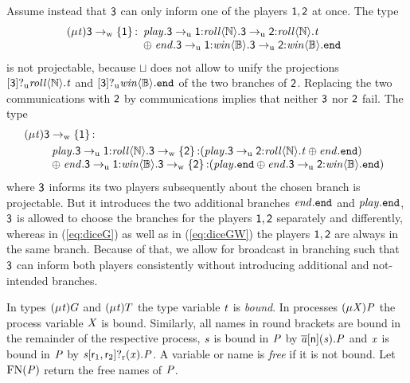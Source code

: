 Assume instead that $ \Role[3] $ can only inform one of the players $ \Role[1], \Role[2] $ at once.
The type
\begin{align*}
	\GRep{\TypeV}{\GBranW{\Role[3]}{\Set{ \Role[1] }}{}
		\begin{array}[t]{l}
			\Label[play].\GComU{\Role[3]}{\Role[1]}{\Label[roll]}{\nat}{\GComU{\Role[3]}{\Role[2]}{\Label[roll]}{\nat}{\TypeV}}\\
			\oplus \; \Label[end].\GComU{\Role[3]}{\Role[1]}{\Label[win]}{\bool}{\GComU{\Role[3]}{\Role[2]}{\Label[win]}{\bool}{\GEnd}}
		\end{array}}
\end{align*}
is not projectable, because $ \sqcup $ does not allow to unify the projections $ \LGetU{\Role[3]}{\Label[roll]}{\nat}{\TypeV} $ and $ \LGetU{\Role[3]}{\Label[win]}{\bool}{\LEnd} $ of the two branches of $ \Role[2] $.
Replacing the two \unrel communications with $ \Role[2] $ by \strongR communications implies that neither $ \Role[3] $ nor $ \Role[2] $ fail.
The type
\begin{align*}
	& \GRep{\TypeV}{\GBranW{\Role[3]}{\Set{ \Role[1] }}{}\\
	& \hspace{2em} \begin{array}[t]{l}
			\Label[play].\GComU{\Role[3]}{\Role[1]}{\Label[roll]}{\nat}{\GBranW{\Role[3]}{\Set{ \Role[2] }}{\left( \Label[play].\GComU{\Role[3]}{\Role[2]}{\Label[roll]}{\nat}{\TypeV} \oplus \Label[end].\GEnd \right)}}\\
			\oplus \; \Label[end].\GComU{\Role[3]}{\Role[1]}{\Label[win]}{\bool}{\GBranW{\Role[3]}{\Set{ \Role[2] }}{\left( \Label[play].\GEnd \oplus \Label[end].\GComU{\Role[3]}{\Role[2]}{\Label[win]}{\bool}{\GEnd} \right)}}
		\end{array}}
\end{align*}
	where $ \Role[3] $ informs its two players subsequently about the chosen branch is projectable.
	But it introduces the two additional branches $ \Label[end].\GEnd $ and $ \Label[play].\GEnd $, \ie $ \Role[3] $ is allowed to choose the branches for the players $ \Role[1], \Role[2] $ separately and differently, whereas in (\ref{eq:diceG}) as well as in (\ref{eq:diceGW}) the players $ \Role[1], \Role[2] $ are always in the same branch.
Because of that, we allow for broadcast in \weakR branching such that $ \Role[3] $ can inform both players consistently without introducing additional and not-intended branches.

In types $ \GRep{\TypeV}{\GT} $ and $ \LRep{\TypeV}{\LT} $ the type variable $ \TypeV $ is \emph{bound}.
In processes $ \PRep{\ProcV}{\PT} $ the process variable $ \ProcV $ is bound.
Similarly, all names in round brackets are bound in the remainder of the respective process, \eg $ \Chan $ is bound in $ \PT $ by $ \PReq{\Chan[a]}{\Role[n]}{\Chan}{\PT} $ and $ \Args $ is bound in $ \PT $ by $ \PGetR{\Chan}{\Role_1}{\Role_2}{\Args}{\PT} $.
A variable or name is \emph{free} if it is not bound. Let $ \FreeNames{\PT} $ return the free names of $ \PT $.

